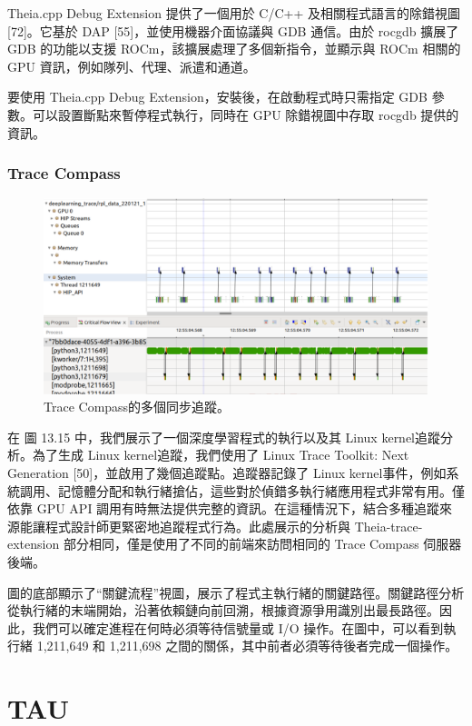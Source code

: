 Theia.cpp Debug Extension 提供了一個用於 C/C++ 及相關程式語言的除錯視圖 [72]。它基於 DAP [55]，並使用機器介面協議與 GDB 通信。由於 rocgdb 擴展了 GDB 的功能以支援 ROCm，該擴展處理了多個新指令，並顯示與 ROCm 相關的 GPU 資訊，例如隊列、代理、派遣和通道。

要使用 Theia.cpp Debug Extension，安裝後，在啟動程式時只需指定 GDB 參數。可以設置斷點來暫停程式執行，同時在 GPU 除錯視圖中存取 rocgdb 提供的資訊。


\subsubsection{Trace Compass}

\begin{figure}
    \centering
    \includegraphics[width=0.9\linewidth]{FileAusiliari/Screenshots/Figure13-15.png}
    \caption{Trace Compass的多個同步追蹤。}
    \label{fig:PAPI15}
\end{figure}

在 圖 13.15 中，我們展示了一個深度學習程式的執行以及其 Linux kernel追蹤分析。為了生成 Linux kernel追蹤，我們使用了 Linux Trace Toolkit: Next Generation [50]，並啟用了幾個追蹤點。追蹤器記錄了 Linux kernel事件，例如系統調用、記憶體分配和執行緒搶佔，這些對於偵錯多執行緒應用程式非常有用。僅依靠 GPU API 調用有時無法提供完整的資訊。在這種情況下，結合多種追蹤來源能讓程式設計師更緊密地追蹤程式行為。此處展示的分析與 Theia-trace-extension 部分相同，僅是使用了不同的前端來訪問相同的 Trace Compass 伺服器後端。

圖的底部顯示了“關鍵流程”視圖，展示了程式主執行緒的關鍵路徑。關鍵路徑分析從執行緒的末端開始，沿著依賴鏈向前回溯，根據資源爭用識別出最長路徑。因此，我們可以確定進程在何時必須等待信號量或 I/O 操作。在圖中，可以看到執行緒 1,211,649 和 1,211,698 之間的關係，其中前者必須等待後者完成一個操作。


\section{TAU}

